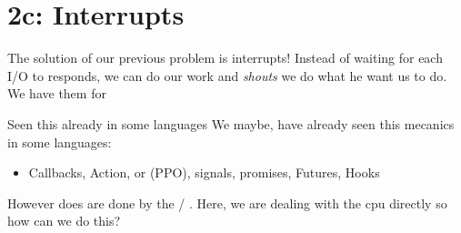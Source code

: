 \section{2c: Interrupts}
The solution of our previous problem is interrupts! Instead of waiting for each I/O to responds, we can do our work and  \textit{shouts} we do what he want us to do. We have them  for \\
\begin{parag}{Seen this already in some languages}
	We maybe, have already seen this mecanics in some languages:
	\begin{itemize}
	    \item Callbacks, Action, or  (PPO), signals, promises, Futures, Hooks
	\end{itemize}
	However does are done by the / . Here, we are dealing with the cpu directly so how can we do this?
\end{parag}
